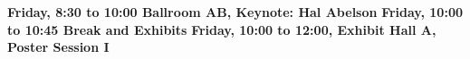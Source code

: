 %
%
\noindent
{\sffamily\bfseries Friday, 8:30 to 10:00 Ballroom AB, Keynote: Hal Abelson}\newline\noindent
{\sffamily\bfseries Friday, 10:00 to 10:45 Break and Exhibits}\newline\noindent
{\sffamily\bfseries Friday, 10:00 to 12:00, Exhibit Hall A, Poster Session I}\newline\noindent







